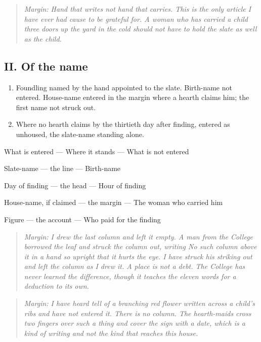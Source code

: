\documentclass{design/chronicle}
\begin{document}
\begin{quote}\itshape \emph{Margin:} Hand that writes not hand that carries. This is the only article I have ever had cause to be grateful for. A woman who has carried a child three doors up the yard in the cold should not have to hold the slate as well as the child.\end{quote}

\subsection*{II. Of the name}

\begin{enumerate}[leftmargin=1.4em,itemsep=1pt,topsep=3pt,parsep=0pt]

\item Foundling named by the hand appointed to the slate. Birth-name not entered. House-name entered in the margin where a hearth claims him; the first name not struck out.

\item Where no hearth claims by the thirtieth day after finding, entered as unhoused, the slate-name standing alone.

\end{enumerate}

What is entered — Where it stands — What is not entered\par

Slate-name — the line — Birth-name\par

Day of finding — the head — Hour of finding\par

House-name, if claimed — the margin — The woman who carried him\par

Figure — the account — Who paid for the finding\par

\begin{quote}\itshape \emph{Margin:} I drew the last column and left it empty. A man from the College borrowed the leaf and struck the column out, writing \emph{No such column} above it in a hand so upright that it hurts the eye. I have struck his striking out and left the column as I drew it. A place is not a debt. The College has never learned the difference, though it teaches the eleven words for a deduction to its own.\end{quote}

\begin{quote}\itshape \emph{Margin:} I have heard tell of a branching red flower written across a child’s ribs and have not entered it. There is no column. The hearth-maids cross two fingers over such a thing and cover the sign with a date, which is a kind of writing and not the kind that reaches this house.\end{quote}
\end{document}
